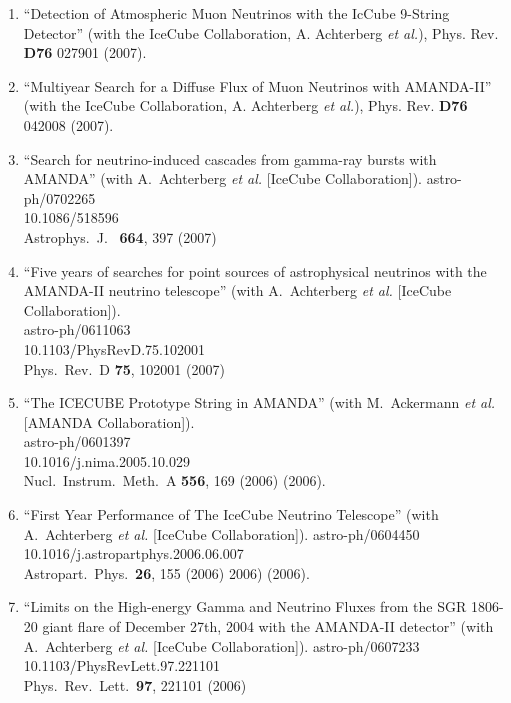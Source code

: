 \begin{enumerate}
\item ``Detection of Atmospheric Muon Neutrinos with the
        IcCube 9-String   Detector'' (with the IceCube
        Collaboration, A.  Achterberg {\it et al.}),   Phys.
        Rev. {\bf D76} 027901 (2007).

\item ``Multiyear Search for a Diffuse Flux of Muon
        Neutrinos with   AMANDA-II'' (with the IceCube
        Collaboration, A.  Achterberg {\it et al.}),   Phys.
        Rev. {\bf D76} 042008 (2007).

\item ``Search for neutrino-induced cascades from gamma-ray
        bursts with   AMANDA'' (with A.~Achterberg {\it et
        al.}  [IceCube Collaboration]). astro-ph/0702265
        \\{}10.1086/518596 \\{}Astrophys.\ J.\ {\bf
        664}, 397 (2007) %

\item ``Five years of searches for point sources of
        astrophysical neutrinos   with the AMANDA-II
        neutrino telescope'' (with A.~Achterberg {\it et
        al.}  [IceCube Collaboration]).
        \\{}astro-ph/0611063
        \\{}10.1103/PhysRevD.75.102001 \\{}Phys.\ Rev.\ D
        {\bf 75}, 102001   (2007) %

\item ``The ICECUBE Prototype String in AMANDA'' (with
        M.~Ackermann {\it et   al.}  [AMANDA
        Collaboration]).  \\{}astro-ph/0601397
        \\{}10.1016/j.nima.2005.10.029 \\{}Nucl.\ Instrum.\
        Meth.\ A {\bf     556}, 169 (2006) %
        (2006).

\item ``First Year Performance of The IceCube Neutrino
        Telescope'' (with A.~Achterberg {\it et al.}
        [IceCube Collaboration]). astro-ph/0604450
        \\{}10.1016/j.astropartphys.2006.06.007
        \\{}Astropart.\ Phys.\ {\bf 26}, 155 (2006) %
        2006)  (2006).

\item ``Limits on the High-energy Gamma and Neutrino Fluxes
        from the SGR   1806-20 giant flare of December 27th,
        2004 with the AMANDA-II   detector'' (with
        A.~Achterberg {\it et al.}  [IceCube
        Collaboration]). astro-ph/0607233
        \\{}10.1103/PhysRevLett.97.221101   \\{}Phys.\ Rev.\
        Lett.\ {\bf 97}, 221101 (2006) %


\end{enumerate}
